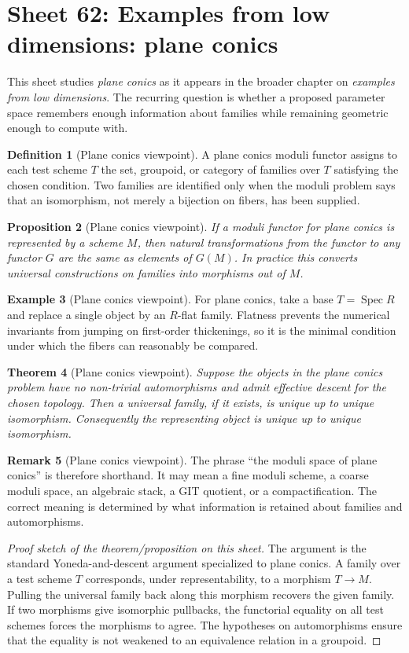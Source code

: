 \documentclass[11pt]{amsart}
\newtheorem{theorem}{Theorem}[section]
\newtheorem{proposition}[theorem]{Proposition}
\theoremstyle{definition}
\newtheorem{definition}[theorem]{Definition}
\newtheorem{example}[theorem]{Example}
\newtheorem{remark}[theorem]{Remark}
\newcommand{\Spec}{\operatorname{Spec}}
\begin{document}
\section{Sheet 62: Examples from low dimensions: plane conics}
This sheet studies \emph{plane conics} as it appears in the broader chapter on \emph{examples from low dimensions}.  The recurring question is whether a proposed parameter space remembers enough information about families while remaining geometric enough to compute with.
\begin{definition}[Plane conics viewpoint]
A plane conics moduli functor assigns to each test scheme $T$ the set, groupoid, or category of families over $T$ satisfying the chosen condition.  Two families are identified only when the moduli problem says that an isomorphism, not merely a bijection on fibers, has been supplied.
\end{definition}
\begin{proposition}[Plane conics viewpoint]
If a moduli functor for plane conics is represented by a scheme $M$, then natural transformations from the functor to any functor $G$ are the same as elements of $G(M)$.  In practice this converts universal constructions on families into morphisms out of $M$.
\end{proposition}
\begin{example}[Plane conics viewpoint]
For plane conics, take a base $T=\Spec R$ and replace a single object by an $R$-flat family.  Flatness prevents the numerical invariants from jumping on first-order thickenings, so it is the minimal condition under which the fibers can reasonably be compared.
\end{example}
\begin{theorem}[Plane conics viewpoint]
Suppose the objects in the plane conics problem have no non-trivial automorphisms and admit effective descent for the chosen topology.  Then a universal family, if it exists, is unique up to unique isomorphism.  Consequently the representing object is unique up to unique isomorphism.
\end{theorem}
\begin{remark}[Plane conics viewpoint]
The phrase ``the moduli space of plane conics'' is therefore shorthand.  It may mean a fine moduli scheme, a coarse moduli space, an algebraic stack, a GIT quotient, or a compactification.  The correct meaning is determined by what information is retained about families and automorphisms.
\end{remark}
\begin{proof}[Proof sketch of the theorem/proposition on this sheet]
The argument is the standard Yoneda-and-descent argument specialized to plane conics.  A family over a test scheme $T$ corresponds, under representability, to a morphism $T\to M$.  Pulling the universal family back along this morphism recovers the given family.  If two morphisms give isomorphic pullbacks, the functorial equality on all test schemes forces the morphisms to agree.  The hypotheses on automorphisms ensure that the equality is not weakened to an equivalence relation in a groupoid.
\end{proof}
\end{document}
